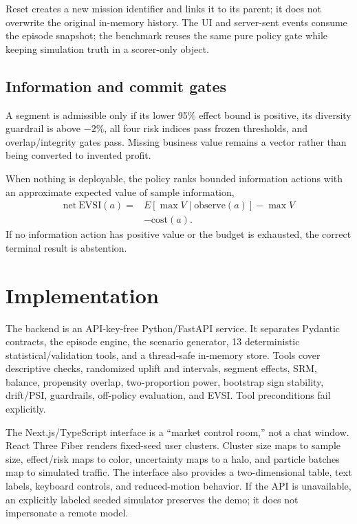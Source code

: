 \documentclass[11pt,twocolumn]{article}
\begin{document}
Reset creates a new mission identifier and links it to its parent; it does not overwrite the original in-memory history. The UI and server-sent events consume the episode snapshot; the benchmark reuses the same pure policy gate while keeping simulation truth in a scorer-only object.

\subsection{Information and commit gates}

A segment is admissible only if its lower 95\% effect bound is positive, its diversity guardrail is above $-2\%$, all four risk indices pass frozen thresholds, and overlap/integrity gates pass. Missing business value remains a vector rather than being converted to invented profit.

When nothing is deployable, the policy ranks bounded information actions with an approximate expected value of sample information,
\begin{align*}
\mathrm{net\ EVSI}(a)={}&E[\max V\mid\mathrm{observe}(a)]-\max V\\
&-\mathrm{cost}(a).
\end{align*}
If no information action has positive value or the budget is exhausted, the correct terminal result is abstention.

\section{Implementation}

The backend is an API-key-free Python/FastAPI service. It separates Pydantic contracts, the episode engine, the scenario generator, 13 deterministic statistical/validation tools, and a thread-safe in-memory store. Tools cover descriptive checks, randomized uplift and intervals, segment effects, SRM, balance, propensity overlap, two-proportion power, bootstrap sign stability, drift/PSI, guardrails, off-policy evaluation, and EVSI. Tool preconditions fail explicitly.

The Next.js/TypeScript interface is a ``market control room,'' not a chat window. React Three Fiber renders fixed-seed user clusters. Cluster size maps to sample size, effect/risk maps to color, uncertainty maps to a halo, and particle batches map to simulated traffic. The interface also provides a two-dimensional table, text labels, keyboard controls, and reduced-motion behavior. If the API is unavailable, an explicitly labeled seeded simulator preserves the demo; it does not impersonate a remote model.
\end{document}
